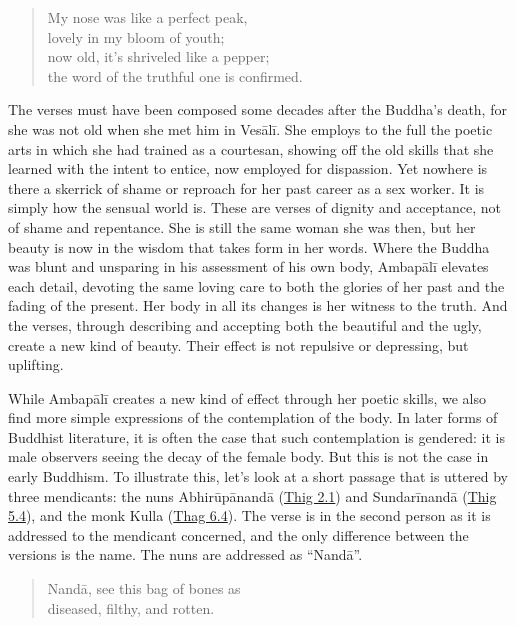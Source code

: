 \documentclass[12pt,openany]{book}%
\begin{document}
\begin{verse}%
My nose was like a perfect peak, \\
lovely in my bloom of youth; \\
now old, it’s shriveled like a pepper; \\
the word of the truthful one is confirmed.

%
\end{verse}

The verses must have been composed some decades after the Buddha’s death, for she was not old when she met him in \textsanskrit{Vesālī}. She employs to the full the poetic arts in which she had trained as a courtesan, showing off the old skills that she learned with the intent to entice, now employed for dispassion. Yet nowhere is there a skerrick of shame or reproach for her past career as a sex worker. It is simply how the sensual world is. These are verses of dignity and acceptance, not of shame and repentance. She is still the same woman she was then, but her beauty is now in the wisdom that takes form in her words. Where the Buddha was blunt and unsparing in his assessment of his own body, \textsanskrit{Ambapālī} elevates each detail, devoting the same loving care to both the glories of her past and the fading of the present. Her body in all its changes is her witness to the truth. And the verses, through describing and accepting both the beautiful and the ugly, create a new kind of beauty. Their effect is not repulsive or depressing, but uplifting.

While \textsanskrit{Ambapālī} creates a new kind of effect through her poetic skills, we also find more simple expressions of the contemplation of the body. In later forms of Buddhist literature, it is often the case that such contemplation is gendered: it is male observers seeing the decay of the female body. But this is not the case in early Buddhism. To illustrate this, let’s look at a short passage that is uttered by three mendicants: the nuns \textsanskrit{Abhirūpānandā} (\href{https://suttacentral.net/thig2.1/en/sujato}{Thig 2.1}) and \textsanskrit{Sundarīnandā} (\href{https://suttacentral.net/thig5.4/en/sujato}{Thig 5.4}), and the monk Kulla (\href{https://suttacentral.net/thag6.4}{Thag 6.4}). The verse is in the second person as it is addressed to the mendicant concerned, and the only difference between the versions is the name. The nuns are addressed as “\textsanskrit{Nandā}”.

\begin{verse}%
\textsanskrit{Nandā}, see this bag of bones as \\
diseased, filthy, and rotten.

%
\end{verse}
\end{document}
